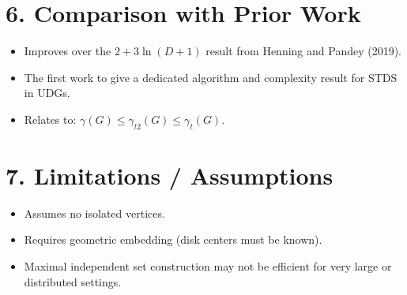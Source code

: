 \documentclass{article}
\begin{document}
\vspace{1em}

\section*{6. Comparison with Prior Work}
\begin{itemize}[leftmargin=1.5em]
    \item Improves over the \( 2 + 3 \ln(D+1) \) result from Henning and Pandey (2019).
    \item The first work to give a dedicated algorithm and complexity result for STDS in UDGs.
    \item Relates to: \( \gamma(G) \leq \gamma_{t2}(G) \leq \gamma_t(G) \).
\end{itemize}

\section*{7. Limitations / Assumptions}
\begin{itemize}[leftmargin=1.5em]
    \item Assumes no isolated vertices.
    \item Requires geometric embedding (disk centers must be known).
    \item Maximal independent set construction may not be efficient for very large or distributed settings.
\end{itemize}
\end{document}
